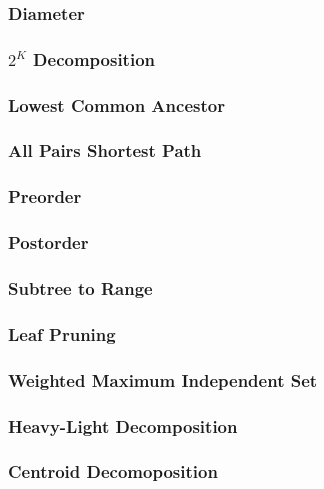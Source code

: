 \documentclass{article}
\begin{document}
\subsubsection{Diameter}

\subsubsection{$2^{K}$ Decomposition}

\subsubsection{Lowest Common Ancestor}

\subsubsection{All Pairs Shortest Path}

\subsubsection{Preorder}

\subsubsection{Postorder}

\subsubsection{Subtree to Range}

\subsubsection{Leaf Pruning}

\subsubsection{Weighted Maximum Independent Set}

\subsubsection{Heavy-Light Decomposition}

\subsubsection{Centroid Decomoposition}

\end{document}
